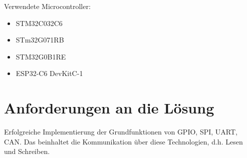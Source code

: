 Verwendete Microcontroller:
\begin{itemize}
	\item STM32C032C6
	\item STm32G071RB
	\item STM32G0B1RE
	\item ESP32-C6 DevKitC-1
\end{itemize}


\section{Anforderungen an die Lösung}
Erfolgreiche Implementierung der Grundfunktionen 
von GPIO, SPI, UART, CAN. Das beinhaltet die Kommunikation über diese Technologien, d.h. Lesen und Schreiben.


